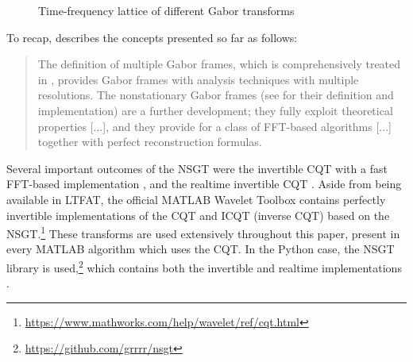 \documentclass[letter,12pt]{article}
\begin{document}
\begin{figure}[ht]
	\centering
	\hspace{0.35em}
	\hspace{0.35em}
	\caption{Time-frequency lattice of different Gabor transforms}
	\label{fig:nsgts}
\end{figure}

To recap, \citet{adaptivecqt} describes the concepts presented so far as follows:

\begin{quote}
	The definition of multiple Gabor frames, which is comprehensively treated in \cite{doerflerphd}, provides Gabor frames with analysis techniques with multiple resolutions. The nonstationary Gabor frames (see \cite{balazs, jaillet} for their definition and implementation) are a further development; they fully exploit theoretical properties [...], and they provide for a class of FFT-based algorithms [...] together with perfect reconstruction formulas.
\end{quote}

Several important outcomes of the NSGT were the invertible CQT with a fast FFT-based implementation \cite{invertiblecqt}, and the realtime invertible CQT \cite{rtcqt}. Aside from being available in LTFAT, the official MATLAB Wavelet Toolbox contains perfectly invertible implementations of the CQT and ICQT (inverse CQT) based on the NSGT.\footnote{\url{https://www.mathworks.com/help/wavelet/ref/cqt.html}} These transforms are used extensively throughout this paper, present in every MATLAB algorithm which uses the CQT. In the Python case, the NSGT library is used,\footnote{\url{https://github.com/grrrr/nsgt}} which contains both the invertible and realtime implementations \cite{invertiblecqt, rtcqt}.
\end{document}
